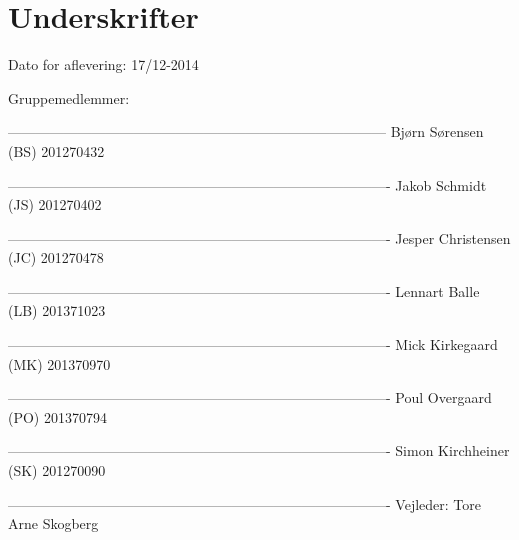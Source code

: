 \chapter*{Underskrifter}

Dato for aflevering: 17/12-2014

Gruppemedlemmer:\newline


--------------------------------------------------------------------------------- \newline
Bjørn Sørensen (BS) 201270432\newline


----------------------------------------------------------------------------------\newline
Jakob Schmidt (JS) 201270402\newline


----------------------------------------------------------------------------------\newline
Jesper Christensen (JC) 201270478\newline


----------------------------------------------------------------------------------\newline
Lennart Balle (LB) 201371023\newline


----------------------------------------------------------------------------------\newline
Mick Kirkegaard (MK) 201370970\newline


----------------------------------------------------------------------------------\newline
Poul Overgaard (PO) 201370794\newline


----------------------------------------------------------------------------------\newline
Simon Kirchheiner (SK) 201270090\newline









----------------------------------------------------------------------------------\newline
Vejleder: Tore Arne Skogberg\newline

\afterpage{\null\newpage}
